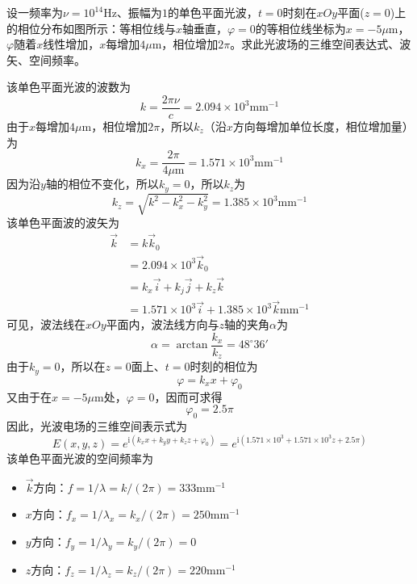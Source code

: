 \documentclass[cn,10pt,chinesefont=founder,math=mtpro2,cite=super,toc=onecol,twoside,openany]{elegantbook}
\begin{document}
\begin{problem}
	设一频率为$\nu=10^{14}\mathrm{Hz}$、振幅为$1$的单色平面光波，$t=0$时刻在$xOy$平面($z=0$)上的相位分布如图所示：等相位线与$x$轴垂直，$\varphi=0$的等相位线坐标为$x=-5\mu\mathrm{m}$，$\varphi$随着$x$线性增加，$x$每增加$4\mu\mathrm{m}$，相位增加$2\pi$。求此光波场的三维空间表达式、波矢、空间频率。
\end{problem}
\begin{solution}
	该单色平面光波的波数为
	\begin{equation}
	k=\frac{2\pi\nu}{c}=2.094\times10^3\mathrm{mm}^{-1}
	\end{equation}
	由于$x$每增加$4\mu\mathrm{m}$，相位增加$2\pi$，所以$k_z$（沿$x$方向每增加单位长度，相位增加量）为
	\begin{equation}
	k_x=\frac{2\pi}{4\mu\mathrm{m}}=1.571\times10^3\mathrm{mm}^{-1}
	\end{equation}
	因为沿$y$轴的相位不变化，所以$k_y=0$，所以$k_z$为
	\begin{equation}
	k_z=\sqrt{k^2-k^2_x-k^2_y}=1.385\times10^3\mathrm{mm}^{-1}
	\end{equation}
	该单色平面波的波矢为
	\begin{equation}
	\begin{aligned}
	\vec{k}&=k\vec{k}_0\\
	&=2.094\times10^3\vec{k}_0\\
	&=k_x\vec{i}+k_j\vec{j}+k_z\vec{k}\\
	&=1.571\times10^3\vec{i}+1.385\times10^3\vec{k}\mathrm{mm}^{-1}
	\end{aligned}
	\end{equation}
	可见，波法线在$xOy$平面内，波法线方向与$z$轴的夹角$\alpha$为
	\begin{equation}
	\alpha=\arctan\frac{k_x}{k_z}=48^{\circ}36'
	\end{equation}
	由于$k_y=0$，所以在$z=0$面上、$t=0$时刻的相位为
	\begin{equation}
	\varphi=k_xx+\varphi_0
	\end{equation}
	又由于在$x=-5\mu\mathrm{m}$处，$\varphi=0$，因而可求得
	\begin{equation}
	\varphi_0=2.5\pi
	\end{equation}
	因此，光波电场的三维空间表示式为
	\begin{equation}
	E(x,y,z)=e^{\mathrm{i}(k_xx+k_yy+k_zz+\varphi_0)}=e^{\mathrm{i}(1.571\times10^3+1.571\times10^3z+2.5\pi)}
	\end{equation}
	该单色平面光波的空间频率为
	\begin{itemize}
		\item $\vec{k}$方向：$f=1/\lambda=k/(2\pi)=333\mathrm{mm}^{-1}$
		\item $x$方向：$f_x=1/\lambda_x=k_x/(2\pi)=250\mathrm{mm}^{-1}$
		\item $y$方向：$f_y=1/\lambda_y=k_y/(2\pi)=0$
		\item $z$方向：$f_z=1/\lambda_z=k_z/(2\pi)=220\mathrm{mm}^{-1}$
	\end{itemize}
\end{solution}
\end{document}
